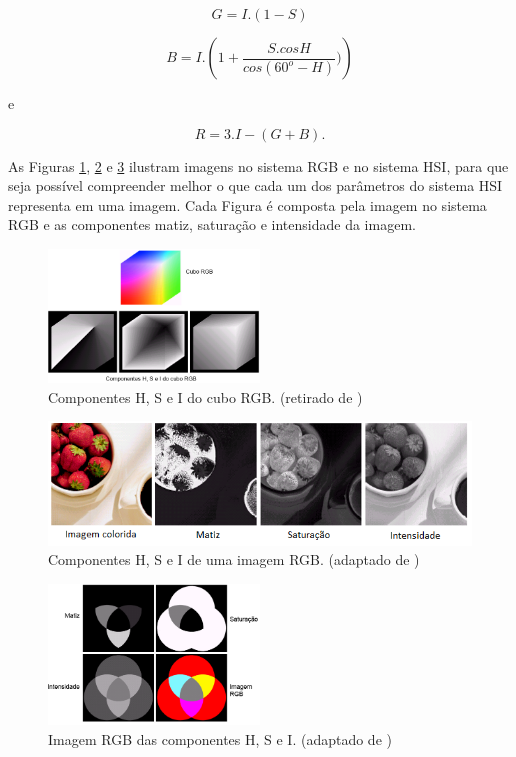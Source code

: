 \documentclass[	12pt, Times, openright, twoside, a4paper, english, brazil]{abntex2}
\begin{document}
\begin{equation}
G=I . (1-S)
\end{equation}

\begin{equation}
B=I  . \left( 1 +  \frac{S . cosH}{cos (60^o - H)} ) \right)
\end{equation}

e

\begin{equation}
R=3 . I-(G+B).
\end{equation}

As Figuras \ref{fig:figuraCuboRGB}, \ref{fig:figuraComponentesHSI} e \ref{fig:figuraComponentesHSI2} ilustram imagens no sistema RGB e no sistema HSI, para que seja possível compreender melhor o que cada um dos parâmetros do sistema HSI representa em uma imagem. Cada Figura é composta pela imagem no sistema RGB e as componentes matiz, saturação e intensidade da imagem.

\begin{figure}[!htb]
\centering \includegraphics[width=0.5\textwidth]{figuraCuboRGB.png}
\caption{Componentes H, S e I do cubo RGB. (retirado de ) \label{fig:figuraCuboRGB}}
\end{figure}

\begin{figure}[!htb]
\centering \includegraphics[width=\textwidth]{figuraComponentesHSI.png}
\caption{Componentes H, S e I de uma imagem RGB. (adaptado de ) \label{fig:figuraComponentesHSI}}
\end{figure}

\begin{figure}[!htb]
\centering \includegraphics[width=0.5\textwidth]{figuraComponentesHSI2.png}
\caption{Imagem RGB das componentes H, S e I. (adaptado de ) \label{fig:figuraComponentesHSI2}}
\end{figure}
\end{document}
